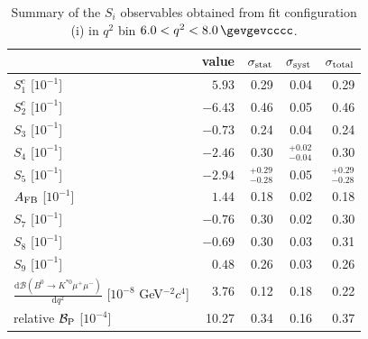 \begin{table}\centering
\caption{Summary of the $S_{i}$ observables obtained from fit configuration (i) in $q^{2}$ bin \mbox{$6.0 < q^{2} < 8.0\,\gevgevcccc$}.}
\label{sec:fit_results:si_s1c:table:summary_bin4}
\begin{tabular}{lrrrr}
\toprule
 & value & $\sigma_{\rm stat}$ & $\sigma_{\rm syst}$ & $\sigma_{\rm total}$ \\
\midrule
$S_{1}^{c}$ [$ 10^{-1}$] & $5.93$ & 0.29 & 0.04 & 0.29 \\
$S_{2}^{c}$ [$ 10^{-1}$] & $-6.43$ & 0.46 & 0.05 & 0.46 \\
$S_{3}$ [$ 10^{-1}$] & $-0.73$ & 0.24 & 0.04 & 0.24 \\
$S_{4}$ [$ 10^{-1}$] & $-2.46$ & 0.30 & $^{+0.02}_{-0.04}$ & 0.30 \\
$S_{5}$ [$ 10^{-1}$] & $-2.94$ & $^{+0.29}_{-0.28}$ & 0.05 & $^{+0.29}_{-0.28}$ \\
$A_{\rm FB}$ [$ 10^{-1}$] & $1.44$ & 0.18 & 0.02 & 0.18 \\
$S_{7}$ [$ 10^{-1}$] & $-0.76$ & 0.30 & 0.02 & 0.30 \\
$S_{8}$ [$ 10^{-1}$] & $-0.69$ & 0.30 & 0.03 & 0.31 \\
$S_{9}$ [$ 10^{-1}$] & $0.48$ & 0.26 & 0.03 & 0.26 \\
\midrule
$\frac{\mathrm{d}\mathcal{B}(B^{0}\to K^{\ast 0}\mu^{+}\mu^{-})}{\mathrm{d} q^{2}}$ [$ 10^{-8}$ GeV$^{-2}c^{4}$] & 3.76 & 0.12 & 0.18 & 0.22 \\
relative $\mathcal{B}_{\rm P}$ [$10^{-4}$] & 10.27 & 0.34 & 0.16 & 0.37 \\
\bottomrule
\end{tabular}
\end{table}
